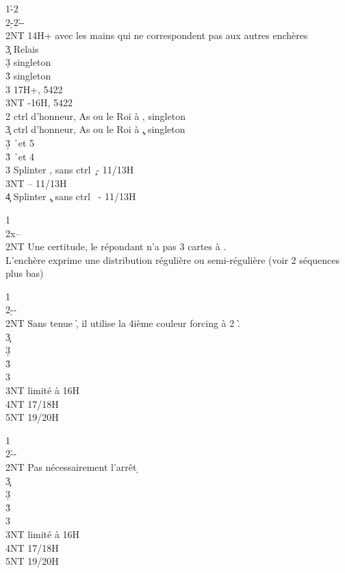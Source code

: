 \documentclass[a4paper]{article}
\begin{document}
\begin{bidtable}
1\h-2\c\\
2\d-2\h--\\
2NT \> 14H+ avec les mains qui ne correspondent pas aux autres enchères\+\\
3\c \> Relais\+\\
3\d \> singleton \c \\
3\h \> singleton \s \\
3\s \> 17H+, 5422\\
3NT -16H, 5422\-\-\\
2\s \> ctrl d’honneur, As ou le Roi à \s , singleton \c \\
3\c \> ctrl d’honneur, As ou le Roi à \c , singleton \s \\
3\d {} \h\ et 5 \d \\
3\h {} \h\ et 4 \d \\
3\s \> Splinter \s , sans ctrl \c\ - 11/13H\\
3NT  – 11/13H\\
4\c \> Splinter \c , sans ctrl \s\ - 11/13H
\end{bidtable}

\begin{bidtable}
1\c\\
2x--\\
2NT \> Une certitude, le répondant n’a pas 3 cartes à \s .\+\\
L’enchère \> exprime une distribution régulière ou semi-régulière (voir 2 séquences plus bas)\-
\end{bidtable}

\begin{bidtable}
1\c\\
2\d--\\
2NT \> Sans tenue \h , il utilise la 4ième couleur forcing à 2 \h .\+\\
3\c {}\\
3\d {}\\
3\h {}\\
3\s {}\\
3NT  limité à 16H\\
4NT  17/18H\\
5NT  19/20H\-
\end{bidtable}

\begin{bidtable}
1\c\\
2\h--\\
2NT \> Pas nécessairement l’arrêt \d \+\\
3\c {}\\
3\d {}\\
3\h {}\\
3\s {}\\
3NT  limité à 16H\\
4NT  17/18H\\
5NT  19/20H\-
\end{bidtable}
\end{document}
